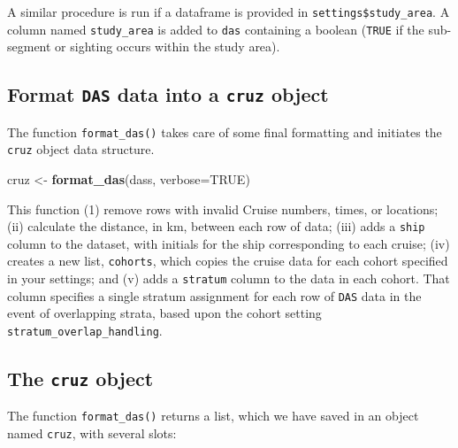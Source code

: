 \documentclass[
]{book}
\newenvironment{Shaded}{\begin{snugshade}}{\end{snugshade}}
\newcommand{\DataTypeTok}[1]{\textcolor[rgb]{0.13,0.29,0.53}{#1}}
\newcommand{\DecValTok}[1]{\textcolor[rgb]{0.00,0.00,0.81}{#1}}
\newcommand{\KeywordTok}[1]{\textcolor[rgb]{0.13,0.29,0.53}{\textbf{#1}}}
\newcommand{\NormalTok}[1]{#1}
\newcommand{\OperatorTok}[1]{\textcolor[rgb]{0.81,0.36,0.00}{\textbf{#1}}}
\newcommand{\OtherTok}[1]{\textcolor[rgb]{0.56,0.35,0.01}{#1}}
\newcommand{\StringTok}[1]{\textcolor[rgb]{0.31,0.60,0.02}{#1}}
\begin{document}
A similar procedure is run if a dataframe is provided in \texttt{settings\$study\_area}. A column named \texttt{study\_area} is added to \texttt{das} containing a boolean (\texttt{TRUE} if the sub-segment or sighting occurs within the study area).

\hypertarget{format-das-data-into-a-cruz-object}{%
\subsection*{\texorpdfstring{Format \texttt{DAS} data into a \texttt{cruz} object}{Format DAS data into a cruz object}}\label{format-das-data-into-a-cruz-object}}

The function \texttt{format\_das()} takes care of some final formatting and initiates the \texttt{cruz} object data structure.

\begin{Shaded}
\begin{Highlighting}[]
\NormalTok{cruz <-}\StringTok{ }\KeywordTok{format_das}\NormalTok{(dass, }\DataTypeTok{verbose=}\OtherTok{TRUE}\NormalTok{)}
\end{Highlighting}
\end{Shaded}

This function (1) remove rows with invalid Cruise numbers, times, or locations; (ii) calculate the distance, in km, between each row of data; (iii) adds a \texttt{ship} column to the dataset, with initials for the ship corresponding to each cruise; (iv) creates a new list, \texttt{cohorts}, which copies the cruise data for each cohort specified in your settings; and (v) adds a \texttt{stratum} column to the data in each cohort. That column specifies
a single stratum assignment for each row of \texttt{DAS} data in the event of overlapping strata, based upon the cohort setting \texttt{stratum\_overlap\_handling}.

\hypertarget{the-cruz-object}{%
\subsection*{\texorpdfstring{The \texttt{cruz} object}{The cruz object}}\label{the-cruz-object}}

The function \texttt{format\_das()} returns a list, which we have saved in an object named \texttt{cruz}, with several slots:

\begin{Shaded}
\end{Shaded}
\end{document}
